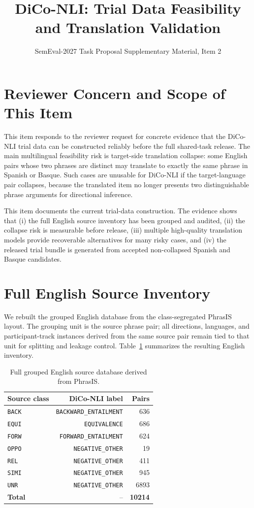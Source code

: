 \documentclass[10pt]{article}
\title{\vspace{-1.35cm}DiCo-NLI: Trial Data Feasibility and Translation Validation}
\author{SemEval-2027 Task Proposal Supplementary Material, Item 2}
\date{\vspace{-0.7cm}}
\begin{document}
\maketitle
\vspace{-0.8cm}

\section{Reviewer Concern and Scope of This Item}

This item responds to the reviewer request for concrete evidence that the
DiCo-NLI trial data can be constructed reliably before the full shared-task
release.  The main multilingual feasibility risk is target-side translation
collapse: some English pairs whose two phrases are distinct may translate to
exactly the same phrase in Spanish or Basque.  Such cases are unusable for
DiCo-NLI if the target-language pair collapses, because the translated item no
longer presents two distinguishable phrase arguments for directional inference.

This item documents the current trial-data construction.  The evidence shows
that (i) the full English source inventory has been grouped and audited, (ii)
the collapse risk is measurable before release, (iii) multiple high-quality
translation models provide recoverable alternatives for many risky cases, and
(iv) the released trial bundle is generated from accepted non-collapsed Spanish
and Basque candidates.

\section{Full English Source Inventory}

We rebuilt the grouped English database from the class-segregated PhrasIS
layout.  The grouping unit is the source phrase pair; all directions, languages,
and participant-track instances derived from the same source pair remain tied to
that unit for splitting and leakage control.  Table~\ref{tab:full-source}
summarizes the resulting English inventory.

\begin{table}[h]
\centering
\small
\begin{tabular}{lrr}
\toprule
Source class & DiCo-NLI label & Pairs \\
\midrule
\texttt{BACK} & \texttt{BACKWARD\_ENTAILMENT} & 636 \\
\texttt{EQUI} & \texttt{EQUIVALENCE} & 686 \\
\texttt{FORW} & \texttt{FORWARD\_ENTAILMENT} & 624 \\
\texttt{OPPO} & \texttt{NEGATIVE\_OTHER} & 19 \\
\texttt{REL} & \texttt{NEGATIVE\_OTHER} & 411 \\
\texttt{SIMI} & \texttt{NEGATIVE\_OTHER} & 945 \\
\texttt{UNR} & \texttt{NEGATIVE\_OTHER} & 6893 \\
\midrule
\textbf{Total} & -- & \textbf{10214} \\
\bottomrule
\end{tabular}
\caption{Full grouped English source database derived from PhrasIS.}
\label{tab:full-source}
\end{table}
\end{document}
